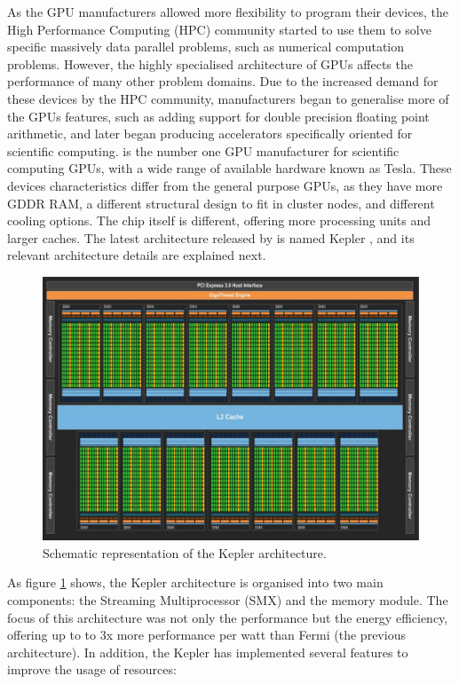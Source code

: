 As the GPU manufacturers allowed more flexibility to program their devices, the High Performance Computing (HPC) community started to use them to solve specific massively data parallel problems, such as numerical computation problems. However, the highly specialised architecture of GPUs affects the performance of many other problem domains. Due to the increased demand for these devices by the HPC community, manufacturers began to generalise more of the GPUs features, such as adding support for double precision floating point arithmetic, and later began producing accelerators specifically oriented for scientific computing. \nvidia is the number one GPU manufacturer for scientific computing GPUs, with a wide range of available hardware known as Tesla. These devices characteristics differ from the general purpose GPUs, as they have more GDDR RAM, a different structural design to fit in cluster nodes, and different cooling options. The chip itself is different, offering more processing units and larger caches. The latest architecture released by \nvidia is named Kepler \cite{NVIDIA:Kepler}, and its relevant architecture details are explained next.

\begin{figure}[!htp]
	\begin{center}
		\includegraphics[scale=0.45]{imgs/kepler_arch.png}
		\caption{Schematic representation of the \nvidia Kepler architecture.}
		\label{fig:kepler}
	\end{center}
\end{figure}

As figure \ref{fig:kepler} shows, the Kepler architecture is organised into two main components: the Streaming Multiprocessor (SMX) and the memory module. The focus of this architecture was not only the performance but the energy efficiency, offering up to to 3x more performance per watt than Fermi (the previous architecture). In addition, the Kepler has implemented several features to improve the usage of resources:

